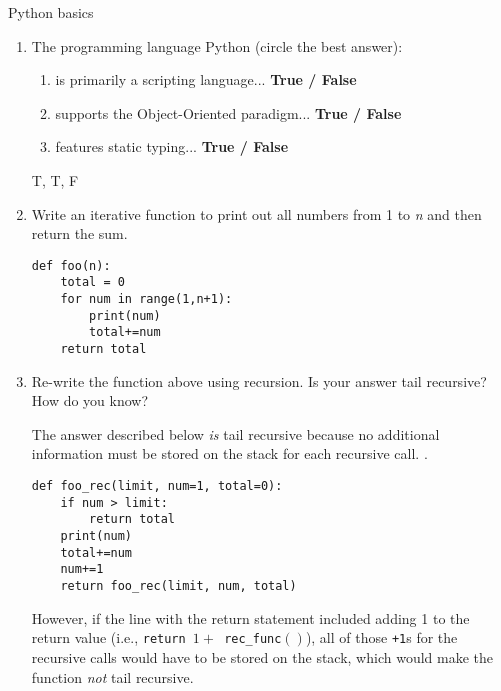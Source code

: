 Python basics
\begin{enumerate}

\item The programming language Python (circle the best answer):\\
	\begin{enumerate}
		\item is primarily a scripting language...
								\hspace{42mm}\textbf{True / False}\\
		\item supports the Object-Oriented paradigm...
								\hspace{30mm}\textbf{True / False}\\
		\item features static typing...
								\hspace{61mm}\textbf{True / False}\\
	\end{enumerate}
\begin{answer}
T, T, F
\end{answer}


\item Write an iterative function to print out all numbers from 1 to \emph{n} and then return the sum.

\begin{answer}
\begin{lstlisting}
def foo(n):
	total = 0
	for num in range(1,n+1):
		print(num)
		total+=num
	return total
\end{lstlisting}
\end{answer}

\item Re-write the function above using recursion. Is your answer tail recursive?  How do you know?

\begin{answer}
The answer described below \emph{is} tail recursive because no additional information must be stored on the stack for each recursive call.
.
\begin{lstlisting}
def foo_rec(limit, num=1, total=0):
	if num > limit:
		return total
	print(num)
	total+=num
	num+=1
	return foo_rec(limit, num, total)
\end{lstlisting}

However, if the line with the return statement included adding 1 to the return value (i.e., \texttt{return $1 +$ rec\_func$()$}), all of those \texttt{+1}s for the recursive calls would have to be stored on the stack, which would make the function \emph{not} tail recursive.
\end{answer}


\end{enumerate}
